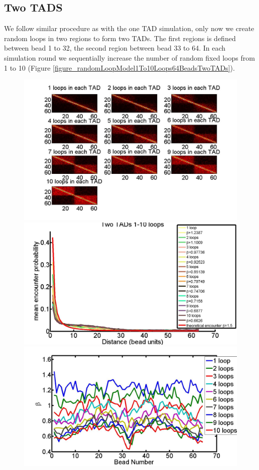 \documentclass[12pt]{book}
\begin{document}
\subsection{Two TADS}
We follow similar procedure as with the one TAD simulation, only now we create random loops in two regions to form two TADs. The first regions is defined between bead 1 to 32, the second region between bead 33 to 64. In each simulation round we sequentially increase the number of random fixed loops from 1 to 10 (Figure \ref{figure_randomLoopModel1To10Loops64BeadsTwoTADs}). 

\begin{figure}[H]
\centering
\includegraphics[scale=0.25]{encounterHistogram1To10LoopsInEachTAD}
\includegraphics[scale=0.1]{meanEncounterProbabilityTwoTADs}
\includegraphics[scale=0.1]{fittedExpTwoTADs1To10Loops}

\end{figure}
\end{document}
